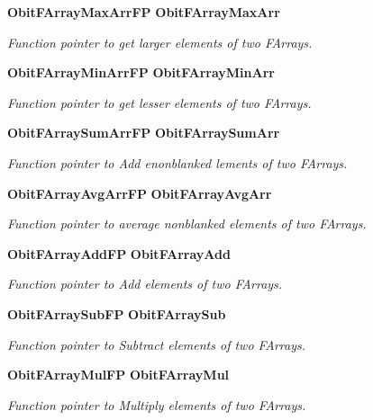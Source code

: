 \begin{CompactItemize}
{\bf Obit\-FArray\-Max\-Arr\-FP} {\bf Obit\-FArray\-Max\-Arr}
\begin{CompactList}\small\item\em Function pointer to get larger elements of two FArrays. \item\end{CompactList}\item 
{\bf Obit\-FArray\-Min\-Arr\-FP} {\bf Obit\-FArray\-Min\-Arr}
\begin{CompactList}\small\item\em Function pointer to get lesser elements of two FArrays. \item\end{CompactList}\item 
{\bf Obit\-FArray\-Sum\-Arr\-FP} {\bf Obit\-FArray\-Sum\-Arr}
\begin{CompactList}\small\item\em Function pointer to Add enonblanked lements of two FArrays. \item\end{CompactList}\item 
{\bf Obit\-FArray\-Avg\-Arr\-FP} {\bf Obit\-FArray\-Avg\-Arr}
\begin{CompactList}\small\item\em Function pointer to average nonblanked elements of two FArrays. \item\end{CompactList}\item 
{\bf Obit\-FArray\-Add\-FP} {\bf Obit\-FArray\-Add}
\begin{CompactList}\small\item\em Function pointer to Add elements of two FArrays. \item\end{CompactList}\item 
{\bf Obit\-FArray\-Sub\-FP} {\bf Obit\-FArray\-Sub}
\begin{CompactList}\small\item\em Function pointer to Subtract elements of two FArrays. \item\end{CompactList}\item 
{\bf Obit\-FArray\-Mul\-FP} {\bf Obit\-FArray\-Mul}
\begin{CompactList}\small\item\em Function pointer to Multiply elements of two FArrays. \item\end{CompactList}\item 

\end{CompactItemize}
